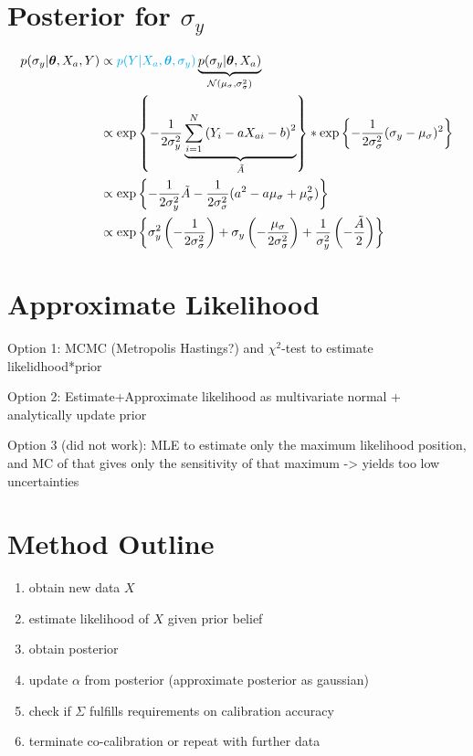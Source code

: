 \documentclass[10pt]{article}
\renewcommand{\vec}[1]{\boldsymbol{#1}}
\newcommand{\mat}[1]{#1}
\begin{document}
    
    \section{Posterior for $\sigma_y$}
    \begin{align}
        p(\sigma_y | \vec{\theta}, X_a, Y) &\propto {\color{cyan} p(Y | X_a, \vec{\theta}, \sigma_y)} \underbrace{p(\sigma_y | \vec{\theta}, X_a)}_{\mathcal{N}(\mu_{\sigma}, \sigma_{\sigma}^2)} \\
        &\propto \exp\left\{ - \frac{1}{2\sigma_y^2} \underbrace{\sum_{i=1}^N \left( Y_i - a X_{ai} - b \right)^2}_{\tilde{A}} \right\} * \exp\left\{ - \frac{1}{2\sigma_{\sigma}^2} ( \sigma_y - \mu_{\sigma} )^2 \right\} \\
        &\propto \exp\left\{ - \frac{1}{2\sigma_y^2} \tilde{A} - \frac{1}{2\sigma_{\sigma}^2} ( a^2 - a \mu_{\sigma} + \mu_{\sigma}^2 ) \right\} \\
        &\propto \exp\left\{ \sigma_y^2 \left( - \frac{1}{2\sigma_{\sigma}^2} \right) + \sigma_y \left( -  \frac{\mu_{\sigma}}{2\sigma_{\sigma}^2}\right) + \frac{1}{\sigma_y^2} \left( - \frac{\tilde{A}}{2} \right) \right\} 
    \end{align}
    
    
    \section{Approximate Likelihood}
    Option 1: MCMC (Metropolis Hastings?) and $\chi^2$-test to estimate likelidhood*prior
    
    Option 2: Estimate+Approximate likelihood as multivariate normal + analytically update prior
    
    Option 3 (did not work): MLE to estimate only the maximum likelihood position, and MC of that gives only the sensitivity of that maximum -> yields too low uncertainties
    
    \section{Method Outline}
    \begin{enumerate}
        \item obtain new data $X$
        \item estimate likelihood of $X$ given prior belief
        \item obtain posterior
        \item update $\alpha$ from posterior (approximate posterior as gaussian)
        \item check if $\mat{\Sigma}$ fulfills requirements on calibration accuracy
        \item terminate co-calibration or repeat with further data
    \end{enumerate}
    
    
    
\end{document}
